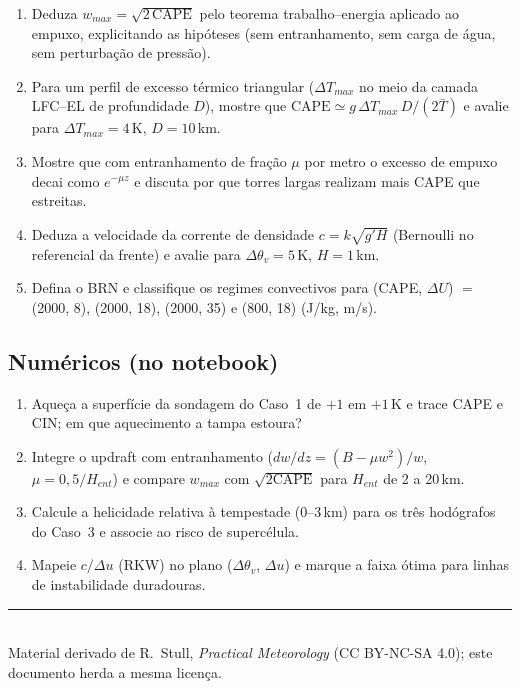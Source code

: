 \documentclass[11pt]{article}
\begin{document}
\begin{enumerate}[label=\textbf{T\arabic*.},itemsep=4pt]
  \item Deduza $w_{max} = \sqrt{2\,\mathrm{CAPE}}$ pelo teorema
        trabalho--energia aplicado ao empuxo, explicitando as
        hipóteses (sem entranhamento, sem carga de água, sem
        perturbação de pressão).
  \item Para um perfil de excesso térmico triangular ($\Delta T_{max}$
        no meio da camada LFC--EL de profundidade $D$), mostre que
        $\mathrm{CAPE} \simeq g\,\Delta T_{max}\,D/(2\bar T)$ e avalie
        para $\Delta T_{max} = 4$\,K, $D = 10$\,km.
  \item Mostre que com entranhamento de fração $\mu$ por metro o
        excesso de empuxo decai como $e^{-\mu z}$ e discuta por que
        torres largas realizam mais CAPE que estreitas.
  \item Deduza a velocidade da corrente de densidade
        $c = k\sqrt{g'H}$ (Bernoulli no referencial da frente) e
        avalie para $\Delta\theta_v = 5$\,K, $H = 1$\,km.
  \item Defina o BRN e classifique os regimes convectivos para
        (CAPE, $\Delta U$) $=$ (2000, 8), (2000, 18), (2000, 35) e
        (800, 18) (J/kg, m/s).
\end{enumerate}

\subsection*{Numéricos (no notebook)}

\begin{enumerate}[label=\textbf{N\arabic*.},itemsep=4pt]
  \item Aqueça a superfície da sondagem do Caso~1 de $+1$ em $+1$\,K e
        trace CAPE e CIN; em que aquecimento a tampa estoura?
  \item Integre o updraft com entranhamento
        ($dw/dz = (B - \mu w^2)/w$, $\mu = 0{,}5/H_{ent}$) e compare
        $w_{max}$ com $\sqrt{2\mathrm{CAPE}}$ para $H_{ent}$ de 2 a
        20\,km.
  \item Calcule a helicidade relativa à tempestade (0--3\,km) para os
        três hodógrafos do Caso~3 e associe ao risco de supercélula.
  \item Mapeie $c/\Delta u$ (RKW) no plano
        ($\Delta\theta_v$, $\Delta u$) e marque a faixa ótima para
        linhas de instabilidade duradouras.
\end{enumerate}

\vspace{1em}
\noindent\rule{\linewidth}{0.4pt}\\
{\scriptsize Material derivado de R.~Stull, \emph{Practical Meteorology}
(CC BY-NC-SA 4.0); este documento herda a mesma licença.}
\end{document}
